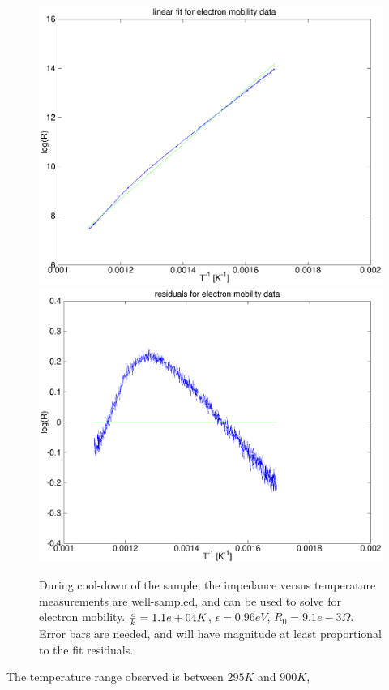 	\begin{figure}
	
	\includegraphics[scale=0.4]{images/electron_mobility.eps} 
	\includegraphics[scale=0.4]{images/electron_mobility_residual.eps}
	\label{f:emobility}
	\caption{During cool-down of the sample, the impedance versus temperature measurements are well-sampled, and can be used to solve for electron mobility.  ${\epsilon\over{k}} = 1.1e+04 K$, $\epsilon = 0.96 eV$, $R_0 = 9.1e-3\Omega$.  Error bars are needed, and will have magnitude at least proportional to the fit residuals.}
	\end{figure}
	The temperature range observed is between $295K$ and $900K$, 
	
